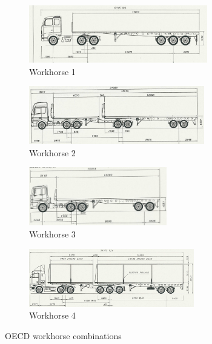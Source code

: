 \begin{figure}[ht!]
	\centering
	\begin{subfigure}[t]{0.45\textwidth}
		\centering
		\includegraphics[height=1.0in]{fig/oecd_workhorse-combination_1}
		\caption{Workhorse 1}
	\end{subfigure}%
	\hfill
	\begin{subfigure}[t]{0.45\textwidth}
		\centering
		\includegraphics[height=1.0in]{fig/oecd_workhorse-combination_2}
		\caption{Workhorse 2}
	\end{subfigure}

	\begin{subfigure}[t]{0.45\textwidth}
		\centering
		\includegraphics[height=1.0in]{fig/oecd_workhorse-combination_3}
		\caption{Workhorse 3}
	\end{subfigure}
	\hfill
	\begin{subfigure}[t]{0.45\textwidth}
		\centering
		\includegraphics[height=1.0in]{fig/oecd_workhorse-combination_4}
		\caption{Workhorse 4}
	\end{subfigure}
	\caption{OECD workhorse combinations}
	\label{figure:OECD workhorse combinations}
\end{figure}


